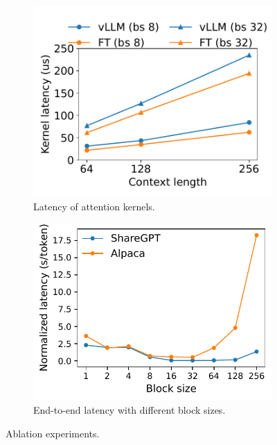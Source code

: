 \documentclass[sigplan,10pt]{acmart}
\begin{document}
\begin{figure}[t]
     \centering
     \begin{subfigure}[t]{0.48\linewidth}
         \centering
         \includegraphics[width=.95\columnwidth]{figures/experiments/micro_latency.pdf}
         \caption{\small Latency of attention kernels.\label{fig:kernel-latency}}
     \end{subfigure}\hfill
     \begin{subfigure}[t]{0.48\linewidth}
         \centering
         \includegraphics[width=.9\columnwidth]{figures/experiments/n1-block-size.pdf}
         \caption{\small End-to-end latency with different block sizes. \label{fig:block-size-n1}}
     \end{subfigure}
     \vspace{-10pt}
     \caption{Ablation experiments.}
\end{figure}
\end{document}
